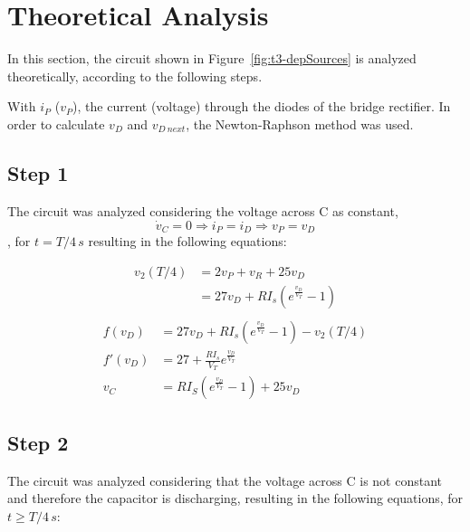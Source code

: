 \section{Theoretical Analysis}
\label{sec:analysis}

In this section, the circuit shown in Figure~\ref{fig:t3-depSources} is analyzed
theoretically, according to the following steps.

With $i_P$ ($v_P$), the current (voltage) through the diodes of the bridge rectifier.
In order to calculate $v_{D}$ and $v_{D\ next}$, the Newton-Raphson method was used.


\subsection{Step 1}\label{subsec:step1}
The circuit was analyzed considering the voltage across C as constant,
$$\dot{v}_C = 0 \Rightarrow i_P=i_D \Rightarrow v_P=v_D$$, for $t = T/4 \,s$
resulting in the following equations:

\begin{equation}\label{step1}
  \begin{split}
    v_2(T/4) &= 2v_P + v_R + 25v_D\\
    &= 27v_D + RI_s(e^{\frac{v_D}{V_T}}-1)\\
  \end{split}
\end{equation}
\vspace{-15pt}
\begin{align}
  f(v_D)&=27v_D + RI_s(e^{\frac{v_D}{V_T}}-1) - v_2(T/4)\\
  f'(v_D)&=27 + \frac{RI_s}{V_T}e^{\frac{v_D}{V_T}}\\
  v_C&=RI_S(e^{\frac{v_D}{V_T}}-1) + 25v_D
\end{align}




\subsection{Step 2}\label{subsec:step2}
The circuit was analyzed considering that the voltage across C is not constant and
therefore the capacitor is discharging, resulting in the following equations,
for $t \geq T/4 \,s$:

